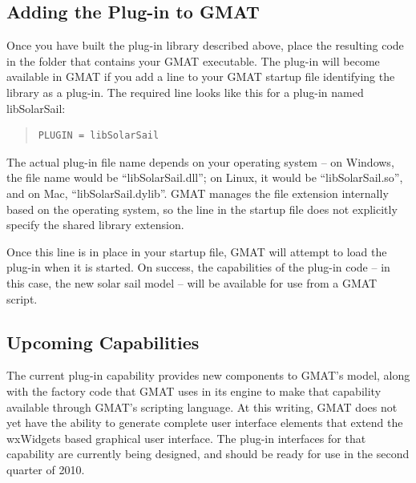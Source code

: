 \subsection{Adding the Plug-in to GMAT}

Once you have built the plug-in library described above, place the resulting
code in the folder that contains your GMAT executable.  The plug-in will become
available in GMAT if you add a line to your GMAT startup file identifying the
library as a plug-in.  The required line looks like this for a plug-in named
libSolarSail:

\begin{quote}
\begin{verbatim}
PLUGIN = libSolarSail
\end{verbatim}
\end{quote}

\noindent The actual plug-in file name depends on your operating system -- on
Windows, the file name would be ``libSolarSail.dll''; on Linux, it would be
``libSolarSail.so'', and on Mac, ``libSolarSail.dylib''.  GMAT manages the file
extension internally based on the operating system, so the line in the startup file
does not explicitly specify the shared library extension.

Once this line is in place in your startup file, GMAT will attempt to load the
plug-in when it is started.  On success, the capabilities of the plug-in code
-- in this case, the new solar sail model -- will be available for use from a
GMAT script.

\subsection{Upcoming Capabilities}

The current plug-in capability provides new components to GMAT's model, along
with the factory code that GMAT uses in its engine to make that capability
available through GMAT's scripting language.  At this writing, GMAT does not
yet have the ability to generate complete user interface elements that extend
the wxWidgets based graphical user interface.  The plug-in interfaces for that
capability are currently being designed, and should be ready for use in the
second quarter of 2010. 
